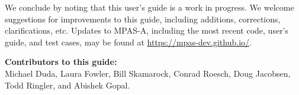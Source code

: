 We conclude by noting that this user's guide is a work in progress.  We welcome
suggestions for improvements to this guide, including additions, corrections,
clarifications, etc.  Updates to MPAS-A, including the most recent code, user's
guide, and test cases, may be found at \hfil\break
\url{https://mpas-dev.github.io/}.

\vspace{8pt}
\noindent
{\bf Contributors to this guide:}\\
Michael Duda, Laura Fowler, Bill Skamarock, Conrad Roesch, Doug Jacobsen, Todd Ringler, and Abishek Gopal.


\vfil {}
